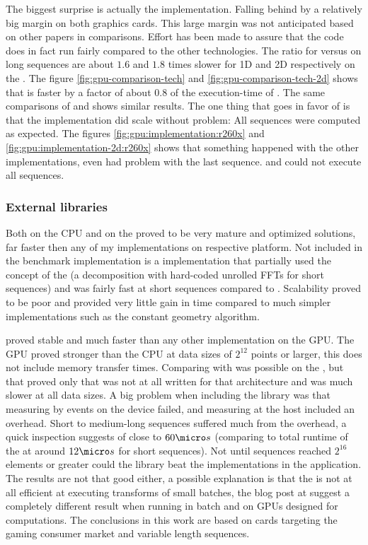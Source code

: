 The biggest surprise is actually the {\OCL} implementation. Falling behind by a relatively big margin on both graphics cards. This large margin was not anticipated based on other papers in comparisons. Effort has been made to assure that the code does in fact run fairly compared to the other technologies. The ratio for {\OCL} versus {\CU} on long sequences are about $1.6$ and $1.8$ times slower for 1D and 2D respectively on the {\NVCARD}. The figure \ref{fig:gpu-comparison-tech} and \ref{fig:gpu-comparison-tech-2d} shows that {\DX} is faster by a factor of about $0.8$ of the execution-time of {\OCL}. The same comparisons of {\OCL} and {\GL} shows similar results. The one thing that goes in favor of {\OCL} is that the implementation did scale without problem: All sequences were computed as expected. The figures \ref{fig:gpu:implementation:r260x} and \ref{fig:gpu:implementation-2d:r260x} shows that something happened with the other implementations, even {\CLFFT} had problem with the last sequence. {\GL} and {\DX} could not execute all sequences.

\subsubsection{External libraries}

Both {\FFTW} on the CPU and {\CUFFT} on the {\NVCARD} proved to be very mature and optimized solutions, far faster then any of my implementations on respective platform. Not included in the benchmark implementation is a {\CPP} implementation that partially used the concept of the {\FFTW} (a decomposition with hard-coded unrolled FFTs for short sequences) and was fairly fast at short sequences compared to {\FFTW}. Scalability proved to be poor and provided very little gain in time compared to much simpler implementations such as the constant geometry algorithm.

{\CUFFT} proved stable and much faster than any other implementation on the GPU. The GPU proved stronger than the CPU at data sizes of $2^{12}$ points or larger, this does not include memory transfer times. Comparing {\CUFFT} with {\CLFFT} was possible on the {\NVCARD}, but that proved only that {\CLFFT} was not at all written for that architecture and was much slower at all data sizes. A big problem when including the {\CLFFT} library was that measuring by events on the device failed, and measuring at the host included an overhead. Short to medium-long sequences suffered much from the overhead, a quick inspection suggests of close to $60{\micro}s$ (comparing to total runtime of the {\OCL} at around $12{\micro}s$ for short sequences). Not until sequences reached $2^{16}$ elements or greater could the library beat the implementations in the application. The results are not that good either, a possible explanation is that the {\CLFFT} is not at all efficient at executing transforms of small batches, the blog post at \cite{amd2015performance} suggest a completely different result when running in batch and on GPUs designed for computations. The conclusions in this work are based on cards targeting the gaming consumer market and variable length sequences.

